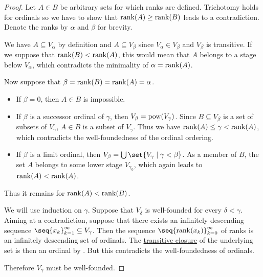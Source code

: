 \begin{proof}
   Let \( A \in B \) be arbitrary sets for which ranks are defined. Trichotomy holds for ordinals so we have to show that \( \operatorname{rank}(A) \geq \operatorname{rank}(B) \) leads to a contradiction. Denote the ranks by \( \alpha \) and \( \beta \) for brevity.

  We have \( A \subseteq V_\alpha \) by definition and \( A \subseteq V_\beta \) since \( V_\alpha \in V_\beta \) and \( V_\beta \) is transitive. If we suppose that \( \operatorname{rank}(B) < \operatorname{rank}(A) \), this would mean that \( A \) belongs to a stage below \( V_\alpha \), which contradicts the minimality of \( \alpha = \operatorname{rank}(A) \).

  Now suppose that \( \beta = \operatorname{rank}(B) = \operatorname{rank}(A) = \alpha \).
  \begin{itemize}
    \item If \( \beta = 0 \), then \( A \in B \) is impossible.

    \item If \( \beta \) is a successor ordinal of \( \gamma \), then \( V_\beta = \operatorname{pow}(V_\gamma) \). Since \( B \subseteq V_\beta \) is a set of subsets of \( V_\gamma \), \( A \in B \) is a subset of \( V_\gamma \). Thus we have \( \operatorname{rank}(A) \leq \gamma < \operatorname{rank}(A) \), which contradicts the well-foundedness of the ordinal ordering.

    \item If \( \beta \) is a limit ordinal, then \( V_\beta = \bigcup\set{ V_\gamma \given \gamma < \beta } \). As a member of \( B \), the set \( A \) belongs to some lower stage \( V_{\gamma_0} \), which again leads to \( \operatorname{rank}(A) < \operatorname{rank}(A) \).
  \end{itemize}

  Thus it remains for \( \operatorname{rank}(A) < \operatorname{rank}(B) \).

   We will use induction on \( \gamma \). Suppose that \( V_\delta \) is well-founded for every \( \delta < \gamma \). Aiming at a contradiction, suppose that there exists an infinitely descending sequence \( \seq{ x_k }_{k=1}^\infty \subseteq V_\gamma \). Then the sequence \( \seq{ \rank(x_k) }_{k=0}^\infty \) of ranks is an infinitely descending set of ordinals. The \hyperref[def:transitive_closure_of_a_set]{transitive closure} of the underlying set is then an ordinal by . But this contradicts the well-foundedness of ordinals.

  Therefore \( V_\gamma \) must be well-founded.


\end{proof}
